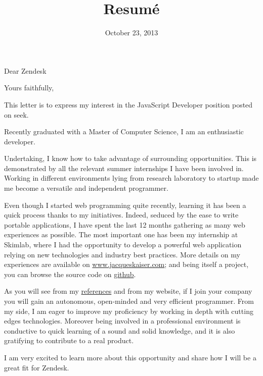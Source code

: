 \documentclass[11pt,a4paper,sans]{moderncv}        %
\title{Resumé}                               %
\begin{document}
\date{October 23, 2013}
\opening{Dear Zendesk}
\closing{Yours faithfully,}

\makelettertitle

This letter is to express my interest in the JavaScript Developer position posted on seek.

Recently graduated with a Master of Computer Science, I am an enthusiastic developer.

Undertaking, I know how to take advantage of surrounding opportunities.
This is demonstrated by all the relevant summer internships I have been involved in.
Working in different environments lying from research laboratory to startup made me become a versatile and independent programmer.

Even though I started web programming quite recently, learning it has been a quick process thanks to my initiatives.
Indeed, seduced by the ease to write portable applications, I have spent the last 12 months gathering as many web experiences as possible.
The most important one has been my internship at Skimlab, where I had the opportunity to develop a powerful web application
relying on new technologies and industry best practices.
More details on my experiences are available on \href{http://www.jacqueskaiser.com}{www.jacqueskaiser.com}; and being itself a project, you can browse the source code on \href{https://www.github.com/jackokaiser/chezjacking}{github}.

As you will see from my \href{http://www.au.linkedin.com/pub/jacques-kaiser/28/6a8/231/en}{references} and from my website, if I join your company
you will gain an autonomous, open-minded and very efficient programmer.
From my side, I am eager to improve my proficiency by working in depth with cutting edges technologies.
Moreover being involved in a professional environment is conductive to quick learning of a sound and solid knowledge,
and it is also gratifying to contribute to a real product.

I am very excited to learn more about this opportunity and share how I will be a great fit for Zendesk.

\makeletterclosing
\end{document}
